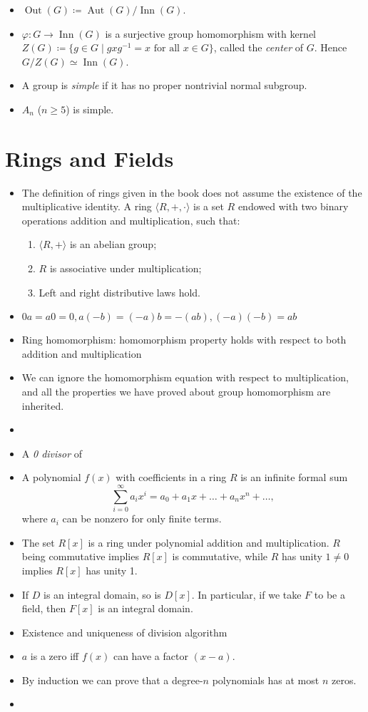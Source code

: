 \documentclass{article}
\newcommand{\aut}{\operatorname{Aut}}
\newcommand{\inn}{\operatorname{Inn}}
\renewcommand{\phi}{\varphi}
\begin{document}
\begin{itemize}
    \item $\operatorname{Out}(G) \coloneqq \aut(G)/\inn(G)$.
    \item $\phi: G \to \inn(G)$ is a surjective group homomorphism with kernel $Z(G) \coloneqq \{g \in G \mid g x g^{-1} = x \text{ for all } x \in G\}$, called the \textit{center} of $G$. Hence $G/Z(G) \simeq \inn(G)$.
    \item A group is \textit{simple} if it has no proper nontrivial normal subgroup.
    \item $A_n$ ($n \geq 5$) is simple.
\end{itemize}

\section{Rings and Fields}
\begin{itemize}
    \item The definition of rings given in the book does not assume the existence of the multiplicative identity. A ring $\langle R,+,\cdot \rangle$ is a set $R$ endowed with two binary operations addition and multiplication, such that:
    \begin{enumerate}[label=(\alph*)]
        \item $\langle R, + \rangle$ is an abelian group;
        \item $R$ is associative under multiplication;
        \item Left and right distributive laws hold.
    \end{enumerate}
    \item $0a = a0 = 0, a(-b)=(-a)b=-(ab), (-a)(-b)=ab$
    \item Ring homomorphism: homomorphism property holds with respect to both addition and multiplication
    \item We can ignore the homomorphism equation with respect to multiplication, and all the properties we have proved about group homomorphism are inherited.
    \item 
    \item A \textit{0 divisor} of 
    \item A polynomial $f(x)$ with coefficients in a ring $R$ is an infinite formal sum $$\sum_{i=0}^\infty a_i x^i = a_0 + a_1 x + \dots + a_n x^n + \dots,$$ where $a_i$ can be nonzero for only finite terms.
    
    
    
    \item The set $R[x]$ is a ring under polynomial addition and multiplication. $R$ being commutative implies $R[x]$ is commutative, while $R$ has unity $1 \not= 0$ implies $R[x]$ has unity 1.
    \item If $D$ is an integral domain, so is $D[x]$. In particular, if we take $F$ to be a field, then $F[x]$ is an integral domain.
    \item Existence and uniqueness of division algorithm
    \item $a$ is a zero iff $f(x)$ can have a factor $(x-a)$.
    \item By induction we can prove that a degree-$n$ polynomials has at most $n$ zeros.
    \item 
    

\end{itemize}
\end{document}
